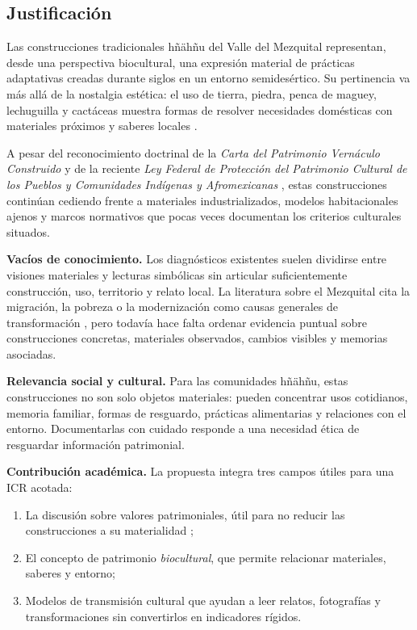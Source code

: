 \subsection{Justificación}

Las construcciones tradicionales hñähñu del Valle del Mezquital representan, desde una perspectiva biocultural, una expresión material de prácticas adaptativas creadas durante siglos en un entorno semidesértico. Su pertinencia va más allá de la nostalgia estética: el uso de tierra, piedra, penca de maguey, lechuguilla y cactáceas muestra formas de resolver necesidades domésticas con materiales próximos y saberes locales \citep{gudynas2010desarrollo}.

A pesar del reconocimiento doctrinal de la \emph{Carta del Patrimonio Vernáculo Construido} \citep{icomos1999carta} y de la reciente \emph{Ley Federal de Protección del Patrimonio Cultural de los Pueblos y Comunidades Indígenas y Afromexicanas} \citep{ley2023patrimonio}, estas construcciones continúan cediendo frente a materiales industrializados, modelos habitacionales ajenos y marcos normativos que pocas veces documentan los criterios culturales situados.

\textbf{Vacíos de conocimiento.}
Los diagnósticos existentes suelen dividirse entre visiones materiales y lecturas simbólicas sin articular suficientemente construcción, uso, territorio y relato local. La literatura sobre el Mezquital cita la migración, la pobreza o la modernización como causas generales de transformación \citep{alvarez2003maguey, juarez2018transformacion}, pero todavía hace falta ordenar evidencia puntual sobre construcciones concretas, materiales observados, cambios visibles y memorias asociadas.

\textbf{Relevancia social y cultural.}
Para las comunidades hñähñu, estas construcciones no son solo objetos materiales: pueden concentrar usos cotidianos, memoria familiar, formas de resguardo, prácticas alimentarias y relaciones con el entorno. Documentarlas con cuidado responde a una necesidad ética de resguardar información patrimonial.

\textbf{Contribución académica.}
La propuesta integra tres campos útiles para una ICR acotada:

\begin{enumerate}
	\item La discusión sobre valores patrimoniales, útil para no reducir las construcciones a su materialidad \citep{delatorre2002values};
	\item El concepto de patrimonio \emph{biocultural}, que permite relacionar materiales, saberes y entorno;
	\item Modelos de transmisión cultural que ayudan a leer relatos, fotografías y transformaciones sin convertirlos en indicadores rígidos.
\end{enumerate}

